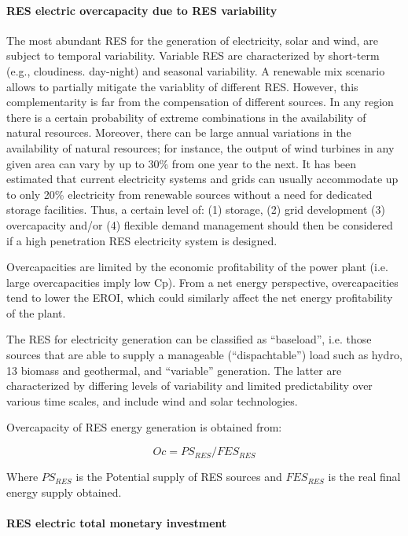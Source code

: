 \paragraph{RES electric overcapacity due to RES variability}

The most abundant RES for the generation of electricity, solar and wind, are subject to temporal variability. Variable RES are characterized by short-term (e.g., cloudiness. day-night) and seasonal variability. A renewable mix scenario allows to partially mitigate the variablity of different RES. However, this complementarity is far from the compensation of different sources. In any region there is a certain probability of extreme combinations in the availability of natural resources. Moreover, there can be large annual variations in the availability of natural resources; for instance, the output of wind turbines in any given area can vary by up to 30\% from one year to the next.  It has been estimated that current electricity systems and grids can usually accommodate up to only 20\% electricity from renewable sources without a need for dedicated storage facilities. Thus, a certain level of: (1) storage, (2) grid development (3) overcapacity and/or (4) flexible demand management should then be considered if a high penetration RES electricity system is designed.


Overcapacities are limited by the economic profitability of the power plant (i.e. large overcapacities imply low Cp). From a net energy perspective, overcapacities tend to lower the EROI, which could  similarly affect the net energy profitability of the plant.

The RES for electricity generation can be classified as “baseload”, i.e. those sources that are able to supply a manageable (“dispachtable”) load such as hydro, 13 biomass and geothermal, and “variable” generation. The latter are characterized by differing levels of variability and limited predictability over various time scales, and include wind and solar technologies.

Overcapacity of RES energy generation is obtained from:

\begin{equation}
    Oc= PS_{RES}/FES_{RES}
    \label{eq:Overcapacity}
\end{equation}

Where $PS_{RES}$ is the Potential supply of RES sources and $FES_{RES}$ is the real final energy supply obtained.

\paragraph{RES electric total monetary investment}

